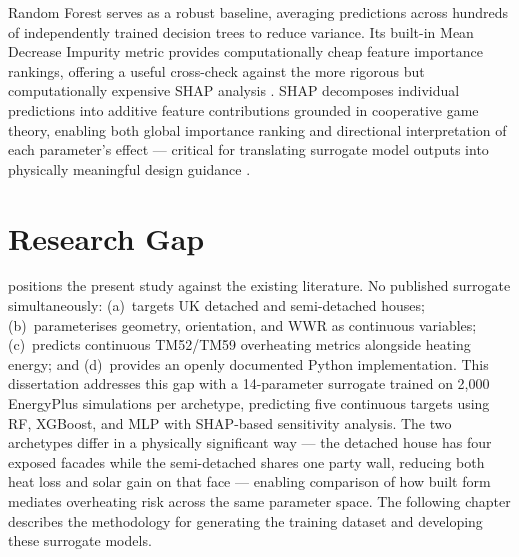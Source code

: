 \documentclass[12pt,a4paper]{report}
\begin{document}
Random Forest \citep{Breiman2001} serves as a robust baseline, averaging predictions across hundreds of independently trained decision trees to reduce variance. Its built-in Mean Decrease Impurity metric provides computationally cheap feature importance rankings, offering a useful cross-check against the more rigorous but computationally expensive SHAP analysis \citep{Lundberg2017}. SHAP decomposes individual predictions into additive feature contributions grounded in cooperative game theory, enabling both global importance ranking and directional interpretation of each parameter's effect --- critical for translating surrogate model outputs into physically meaningful design guidance \citep{BagheriEsfeh2025}.


\section{Research Gap}
\label{sec:research-gap}

 positions the present study against the existing literature. No published surrogate simultaneously: (a)~targets UK detached and semi-detached houses; (b)~parameterises geometry, orientation, and WWR as continuous variables; (c)~predicts continuous TM52/TM59 overheating metrics alongside heating energy; and (d)~provides an openly documented Python implementation. This dissertation addresses this gap with a 14-parameter surrogate trained on 2{,}000 EnergyPlus simulations per archetype, predicting five continuous targets using RF, XGBoost, and MLP with SHAP-based sensitivity analysis. The two archetypes differ in a physically significant way --- the detached house has four exposed facades while the semi-detached shares one party wall, reducing both heat loss and solar gain on that face --- enabling comparison of how built form mediates overheating risk across the same parameter space. The following chapter describes the methodology for generating the training dataset and developing these surrogate models.
\end{document}
